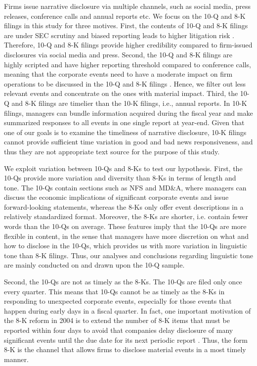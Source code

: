 \documentclass[letterpaper,11pt]{article}
\begin{document}
\begin{spacing}{1.5}
Firms issue narrative disclosure via multiple channels, such as social media, press releases, conference calls and annual reports etc. We focus on the 10-Q and 8-K filings in this study for three motives. First, the contents of 10-Q and 8-K filings are under SEC scrutiny and biased reporting leads to higher litigation risk \cite{rogersDisclosureToneShareholder2011}. Therefore, 10-Q and 8-K filings provide higher credibility compared to firm-issued disclosures via social media and press. Second, the 10-Q and 8-K filings are highly scripted and have higher reporting threshold compared to conference calls, meaning that the corporate events need to have a moderate impact on firm operations to be discussed in the 10-Q and 8-K filings \cite{hassanFirmLevelPoliticalRisk2019}. Hence, we filter out less relevant events and concentrate on the ones with material impact. Third, the 10-Q and 8-K filings are timelier than the 10-K filings, i.e., annual reports. In 10-K filings, managers can bundle information acquired during the fiscal year and make summarized responses to all events in one single report at year-end. Given that one of our goals is to examine the timeliness of narrative disclosure, 10-K filings cannot provide sufficient time variation in good and bad news responsiveness, and thus they are not appropriate text source for the purpose of this study.

We exploit variation between 10-Qs and 8-Ks to test our hypothesis. First, the 10-Qs provide more variation and diversity than 8-Ks in terms of length and tone. The 10-Qs contain sections such as NFS and MD\&A, where managers can discuss the economic implications of significant corporate events and issue forward-looking statements, whereas the 8-Ks only offer event descriptions in a relatively standardized format. Moreover, the 8-Ks are shorter, i.e. contain fewer words than the 10-Qs on average. These features imply that the 10-Qs are more flexible in content, in the sense that managers have more discretion on what and how to disclose in the 10-Qs, which provides us with more variation in linguistic tone than 8-K filings. Thus, our analyses and conclusions regarding linguistic tone are mainly conducted on and drawn upon the 10-Q sample. 

Second, the 10-Qs are not as timely as the 8-Ks. The 10-Qs are filed only once every quarter. This means that 10-Qs cannot be as timely as the 8-Ks in responding to unexpected corporate events, especially for those events that happen during early days in a fiscal quarter. In fact, one important motivation of the 8-K reform in 2004 is to extend the number of 8-K items that must be reported within four days to avoid that companies delay disclosure of many significant events until the due date for its next periodic report \cite{secFinalRuleAdditional2004}. Thus, the form 8-K is the channel that allows firms to disclose material events in a most timely manner.


\end{spacing}
\end{document}
